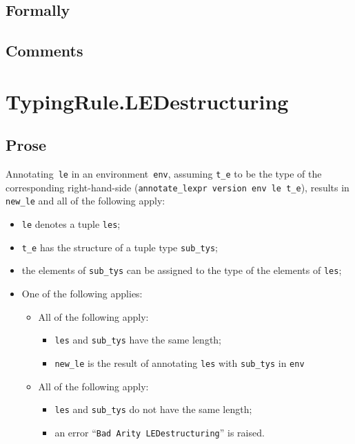 \documentclass{book}
\begin{document}
  \subsection{Formally}

  \subsection{Comments}

\section{TypingRule.LEDestructuring \label{sec:TypingRule.LEDestructuring}}

  \subsection{Prose}
   Annotating~\texttt{le} in an environment~\texttt{env}, assuming
\texttt{t\_e} to be the type of the corresponding right-hand-side
(\texttt{annotate\_lexpr version env le t\_e}), results in \texttt{new\_le} and
all of the following apply:
   \begin{itemize}
   \item \texttt{le} denotes a tuple \texttt{les};
   \item \texttt{t\_e} has the structure of a tuple type \texttt{sub\_tys};
   \item the elements of \texttt{sub\_tys} can be assigned to the type of the elements of \texttt{les};
   \item One of the following applies:
     \begin{itemize}
     \item All of the following apply:
       \begin{itemize}
       \item \texttt{les} and \texttt{sub\_tys} have the same length;
       \item \texttt{new\_le} is the result of annotating \texttt{les} with \texttt{sub\_tys} in \texttt{env}
       \end{itemize}
     \item All of the following apply:
       \begin{itemize}
       \item \texttt{les} and \texttt{sub\_tys} do not have the same length;
       \item an error ``\texttt{Bad Arity LEDestructuring}'' is raised.
       \end{itemize}
     \end{itemize}
   \end{itemize}
\end{document}
